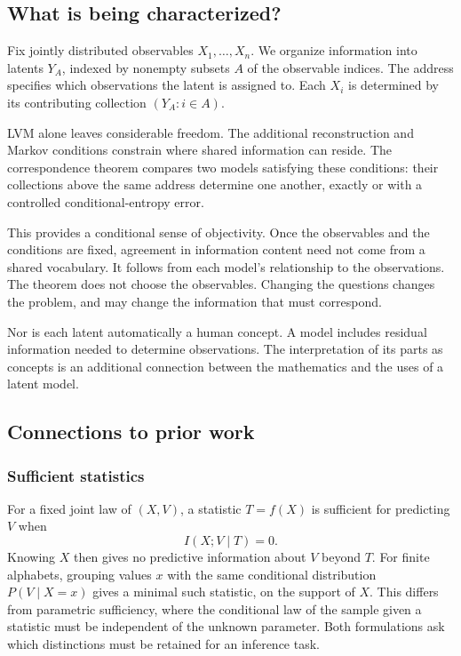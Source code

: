 \documentclass[11pt]{article}
\begin{document}
\subsection{What is being characterized?}
Fix jointly distributed observables $X_1,\ldots,X_n$. We organize information
into latents $Y_A$, indexed by nonempty subsets $A$ of the observable indices.
The address specifies which observations the latent is assigned to. Each $X_i$
is determined by its contributing collection $(Y_A:i\in A)$.

LVM alone leaves considerable freedom. The additional reconstruction
and Markov conditions constrain where shared information can reside. The
correspondence theorem compares two models satisfying these conditions: their
collections above the same address determine one another, exactly or with a
controlled conditional-entropy error.

This provides a conditional sense of objectivity. Once the observables and the
conditions are fixed, agreement in information content need not come from a
shared vocabulary. It follows from each model's relationship to the observations.
The theorem does not choose the observables. Changing the questions changes the
problem, and may change the information that must correspond.

Nor is each latent automatically a human concept. A model includes residual
information needed to determine observations. The interpretation of its parts
as concepts is an additional connection between the mathematics and the uses of
a latent model.

\subsection{Connections to prior work}
\label{sec:context-connections}
\subsubsection{Sufficient statistics}
For a fixed joint law of $(X,V)$, a statistic $T=f(X)$ is sufficient for predicting
$V$ when
\[
 I(X;V\mid T)=0.
\]
Knowing $X$ then gives no predictive information about $V$ beyond $T$.
For finite alphabets, grouping values $x$ with the same conditional distribution
$P(V\mid X=x)$ gives a minimal such statistic, on the support of $X$.
This differs from parametric sufficiency, where the conditional law of
the sample given a statistic must be independent of the unknown parameter.
Both formulations ask which distinctions must be retained for an inference task.
\end{document}
